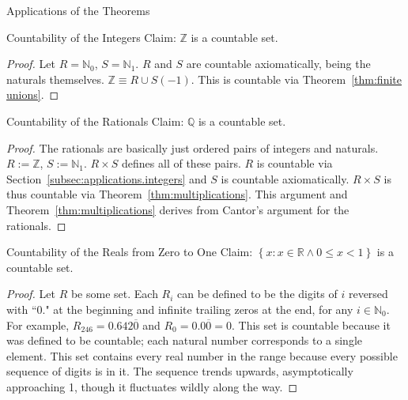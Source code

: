 \documentclass[12pt]{article}
\begin{document}
\pagebreak\begin{section}{Applications of the Theorems}\label{sec:applications}
	\begin{subsection}{Countability of the Integers}\label{subsec:applications.integers}
		Claim: $\mathbb Z$ is a countable set.
		\begin{proof}
			Let $R=\mathbb N_0$, $S=\mathbb N_1$. $R$ and $S$ are countable axiomatically,
			being the naturals themselves. $\mathbb Z\equiv R\cup S(-1)$. This is countable
			via Theorem~\ref{thm:finite unions}.
		\end{proof}
	\end{subsection}

	\vspace{-1em}\begin{subsection}{Countability of the Rationals}\label{subsec:applications.rationals}
		Claim: $\mathbb Q$ is a countable set.
		\begin{proof}
			The rationals are basically just ordered pairs of integers and naturals.
			$R:=\mathbb Z$, $S:=\mathbb N_1$. $R\times S$ defines all of these pairs.
			$R$ is countable via Section~\ref{subsec:applications.integers} and $S$ is
			countable axiomatically. $R\times S$ is thus countable via Theorem~\ref{thm:multiplications}.
			This argument and Theorem~\ref{thm:multiplications} derives from Cantor's argument for the rationals.
		\end{proof}
	\end{subsection}

	\vspace{-1em}\begin{subsection}{Countability of the Reals from Zero to One}\label{subsec:applications.reals 0 to 1}
		Claim: $\left\{x:x\in\mathbb R\land0\le x<1\right\}$ is a countable set.
		\begin{proof}
			Let $R$ be some set. Each $R_i$ can be defined to be the digits of $i$ reversed with
			``0." at the beginning and infinite trailing zeros at the end, for any $i\in\mathbb N_0$.
			For example, $R_{246}=0.642\overline0$ and $R_0=0.0\overline0=0$. This set is countable
			because it was defined to be countable; each natural number corresponds to a single element.
			This set contains every real number in the range because every possible sequence of digits
			is in it. The sequence trends upwards, asymptotically approaching 1, though it fluctuates
			wildly along the way.
		\end{proof}
	\end{subsection}


\end{section}
\end{document}
